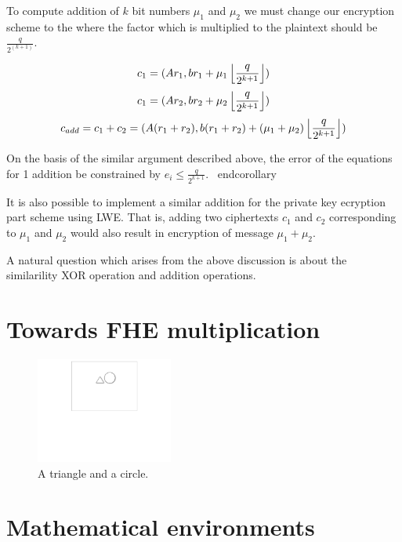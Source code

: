 \documentclass[usletter]{article}
\begin{document}
\begin{corollary}
To compute addition of $k$ bit numbers $\mu_1$ and $\mu_2$ we must change our 
encryption scheme to the where the factor which is multiplied to the plaintext should be $\frac{q}{2^(k+1)}$. 

$$c_1 = ( Ar_1, br_1 + \mu_1\left\lfloor \frac{q}{2^{k+1}} \right\rfloor )$$
$$c_1 = ( Ar_2, br_2 + \mu_2\left\lfloor \frac{q}{2^{k+1}} \right\rfloor )$$
$$c_{add} = c_1 + c_2 = ( A(r_1 + r_2), b(r_1 +r_2) + (\mu_1 + \mu_2)\left\lfloor \frac{q}{2^{k+1}} \right\rfloor )$$

On the basis of the similar argument described above, the error of the equations for 1 addition be 
constrained by $e_i \leq \frac{q}{2^{k+1}}$.
\	end{corollary}
\begin{remark}
It is also possible to implement a similar addition for the private key ecryption part scheme 
using LWE. That is, adding two ciphertexts $c_1$ and $c_2$ corresponding to $\mu_1$ and $\mu_2$
would also result in encryption of message $\mu_1 + \mu_2$.
\end{remark}

\begin{remark}
A natural question which arises from the above discussion is about the similarility XOR operation 
and addition operations.   
\end{remark}

\section{Towards FHE multiplication}


\begin{figure}
\begin{center}
\includegraphics[width=0.4\textwidth]{triangle-circle}
\end{center}
\caption{A triangle and a circle.}
\label{fig:triangle-circle}
\end{figure}



\section{Mathematical environments}


\end{corollary}
\end{document}
